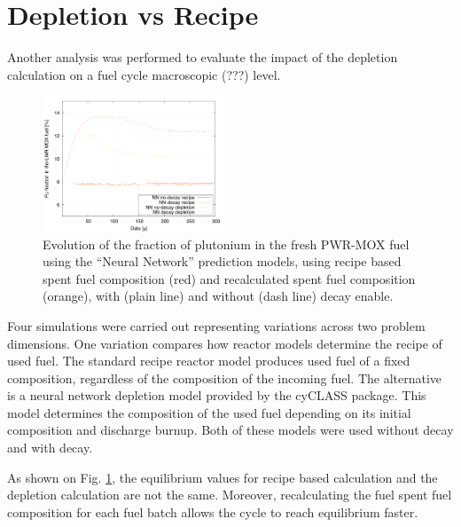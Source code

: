 \documentclass{anstrans}
\begin{document}
\section{Depletion vs Recipe}

Another analysis was performed to evaluate the impact of the depletion
calculation on a fuel cycle macroscopic (???) level.

\begin{figure}[ht] %
  \centering
  \includegraphics[width=0.48\textwidth]{irradiation_pu_contribution.png}
  \caption{Evolution of the fraction of plutonium in the fresh PWR-MOX fuel
    using the ``Neural Network'' prediction models, using recipe based spent
    fuel composition (red) and recalculated spent fuel composition (orange),
    with (plain line) and without (dash line) decay enable.}
  \label{fig:depletion}
\end{figure}



Four simulations were carried out representing variations across two problem
dimensions.  One variation compares how reactor models determine the recipe of
used fuel.  The standard recipe reactor model produces used fuel of a fixed
composition, regardless of the composition of the incoming fuel.  The
alternative is a neural network depletion model provided by the cyCLASS
package.  This model determines the composition of the used fuel depending on
its initial composition and discharge burnup.  Both of these models were used
without decay and with decay.

As shown on Fig. \ref{fig:depletion}, the equilibrium values for recipe based
calculation and the depletion calculation are not the same. Moreover,
recalculating the fuel spent fuel composition for each fuel batch allows the
cycle to reach equilibrium faster.
\end{document}

